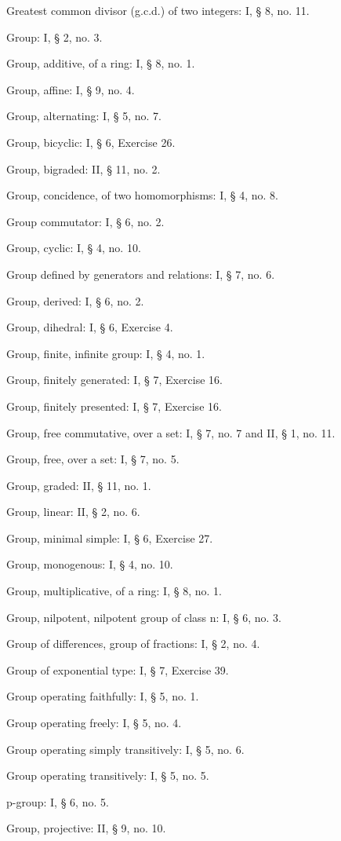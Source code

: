 Greatest common divisor (g.c.d.) of two integers: I, § 8, no. 11.

Group: I, § 2, no. 3.

Group, additive, of a ring: I, § 8, no. 1.

Group, affine: I, § 9, no. 4.

Group, alternating: I, § 5, no. 7.

Group, bicyclic: I, § 6, Exercise 26.

Group, bigraded: II, § 11, no. 2.

Group, concidence, of two homomorphisms: I, § 4, no. 8.

Group commutator: I, § 6, no. 2.

Group, cyclic: I, § 4, no. 10.

Group defined by generators and relations: I, § 7, no. 6.

Group, derived: I, § 6, no. 2.

Group, dihedral: I, § 6, Exercise 4.

Group, finite, infinite group: I, § 4, no. 1.

Group, finitely generated: I, § 7, Exercise 16.

Group, finitely presented: I, § 7, Exercise 16.

Group, free commutative, over a set: I, § 7, no. 7 and II, § 1, no. 11.

Group, free, over a set: I, § 7, no. 5.

Group, graded: II, § 11, no. 1.

Group, linear: II, § 2, no. 6.

Group, minimal simple: I, § 6, Exercise 27.

Group, monogenous: I, § 4, no. 10.

Group, multiplicative, of a ring: I, § 8, no. 1.

Group, nilpotent, nilpotent group of class n: I, § 6, no. 3.

Group of differences, group of fractions: I, § 2, no. 4.

Group of exponential type: I, § 7, Exercise 39.

Group operating faithfully: I, § 5, no. 1.

Group operating freely: I, § 5, no. 4.

Group operating simply transitively: I, § 5, no. 6.

Group operating transitively: I, § 5, no. 5.

p-group: I, § 6, no. 5.

Group, projective: II, § 9, no. 10.

